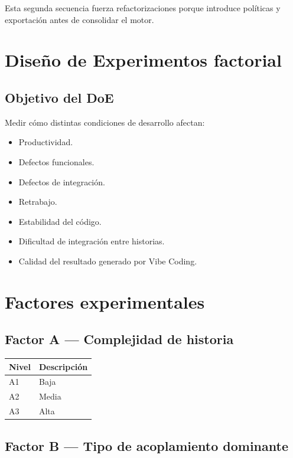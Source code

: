 \documentclass[11pt,a4paper]{article}
\begin{document}
Esta segunda secuencia fuerza refactorizaciones porque introduce pol\'iticas y exportaci\'on antes de consolidar el motor.

\section{Dise\~no de Experimentos factorial}

\subsection{Objetivo del DoE}

Medir c\'omo distintas condiciones de desarrollo afectan:

\begin{itemize}[leftmargin=*]
    \item Productividad.
    \item Defectos funcionales.
    \item Defectos de integraci\'on.
    \item Retrabajo.
    \item Estabilidad del c\'odigo.
    \item Dificultad de integraci\'on entre historias.
    \item Calidad del resultado generado por Vibe Coding.
\end{itemize}

\section{Factores experimentales}

\subsection{Factor A --- Complejidad de historia}

\begin{table}[h!]
\centering
\begin{tabular}{ll}
\toprule
\textbf{Nivel} & \textbf{Descripci\'on} \\
\midrule
A1 & Baja \\
A2 & Media \\
A3 & Alta \\
\bottomrule
\end{tabular}
\end{table}

\subsection{Factor B --- Tipo de acoplamiento dominante}
\end{document}
